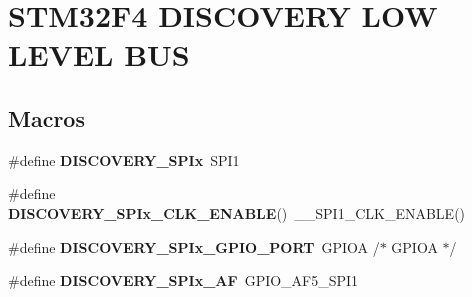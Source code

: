 \hypertarget{group___s_t_m32_f4___d_i_s_c_o_v_e_r_y___l_o_w___l_e_v_e_l___b_u_s}{}\section{S\+T\+M32\+F4 D\+I\+S\+C\+O\+V\+E\+RY L\+OW L\+E\+V\+EL B\+US}
\label{group___s_t_m32_f4___d_i_s_c_o_v_e_r_y___l_o_w___l_e_v_e_l___b_u_s}
\subsection*{Macros}
\begin{DoxyCompactItemize}
\item 
\mbox{\label{group___s_t_m32_f4___d_i_s_c_o_v_e_r_y___l_o_w___l_e_v_e_l___b_u_s_ga435e80a9af73b78f4c18169ef400d2f1}} 
\#define {\bfseries D\+I\+S\+C\+O\+V\+E\+R\+Y\+\_\+\+S\+P\+Ix}~S\+P\+I1
\item 
\mbox{\label{group___s_t_m32_f4___d_i_s_c_o_v_e_r_y___l_o_w___l_e_v_e_l___b_u_s_ga77e345c06dc200036ca4054f7af8fa18}} 
\#define {\bfseries D\+I\+S\+C\+O\+V\+E\+R\+Y\+\_\+\+S\+P\+Ix\+\_\+\+C\+L\+K\+\_\+\+E\+N\+A\+B\+LE}()~\+\_\+\+\_\+\+S\+P\+I1\+\_\+\+C\+L\+K\+\_\+\+E\+N\+A\+B\+LE()
\item 
\mbox{\label{group___s_t_m32_f4___d_i_s_c_o_v_e_r_y___l_o_w___l_e_v_e_l___b_u_s_ga361bc1354f162b6d3ea054a6e067e5ec}} 
\#define {\bfseries D\+I\+S\+C\+O\+V\+E\+R\+Y\+\_\+\+S\+P\+Ix\+\_\+\+G\+P\+I\+O\+\_\+\+P\+O\+RT}~G\+P\+I\+OA                      /$\ast$ G\+P\+I\+OA $\ast$/
\item 
\mbox{\label{group___s_t_m32_f4___d_i_s_c_o_v_e_r_y___l_o_w___l_e_v_e_l___b_u_s_ga52e001019063760b0afd48ee7ce6ad49}} 
\#define {\bfseries D\+I\+S\+C\+O\+V\+E\+R\+Y\+\_\+\+S\+P\+Ix\+\_\+\+AF}~G\+P\+I\+O\+\_\+\+A\+F5\+\_\+\+S\+P\+I1
\item 
\mbox{\label{group___s_t_m32_f4___d_i_s_c_o_v_e_r_y___l_o_w___l_e_v_e_l___b_u_s_gaa729ee5b6bae4ac03303f4bddb7e50ba}} 

\end{DoxyCompactItemize}
